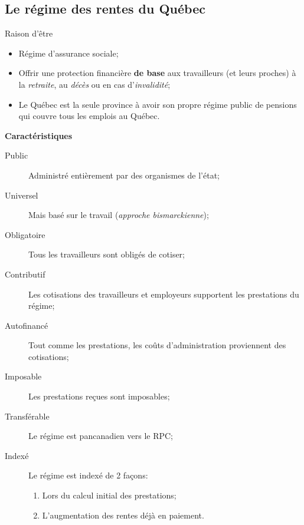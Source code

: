 \documentclass[10pt, french]{article}
\begin{document}
\begin{multicols*}{3}
\newpage

\section{Le régime des rentes du Québec}

\begin{conceptgen}{Raison d'être}
\begin{itemize}[leftmargin = *]
	\item	Régime d'assurance sociale;
	\item	Offrir une protection financière \textbf{de base} aux travailleurs (et leurs proches) à la \textit{retraite}, au \textit{décès} ou en cas d'\textit{invalidité};
	\item	Le Québec est la seule province à avoir son propre régime public de pensions qui couvre tous les emplois au Québec.
\end{itemize}

\textbf{Caractéristiques}
\begin{description}
	\item[Public]	Administré entièrement par des organismes de l'état;
	\item[Universel]	Mais basé sur le travail (\textit{approche bismarckienne});
	\item[Obligatoire]	Tous les travailleurs sont obligés de cotiser;
	\item[Contributif]	Les cotisations des travailleurs et employeurs supportent les prestations du régime;
	\item[Autofinancé]	Tout comme les prestations, les coûts d'administration proviennent des cotisations;
	\item[Imposable]	Les prestations reçues sont imposables;
	\item[Transférable]	Le régime est pancanadien vers le RPC;
	\item[Indexé]	Le régime est indexé de 2 façons:
		\begin{enumerate}[leftmargin = *]
		\item	Lors du calcul initial des prestations;
		\item	L'augmentation des rentes déjà en paiement.
		\end{enumerate}
\end{description}
\end{conceptgen}


\end{multicols*}
\end{document}
